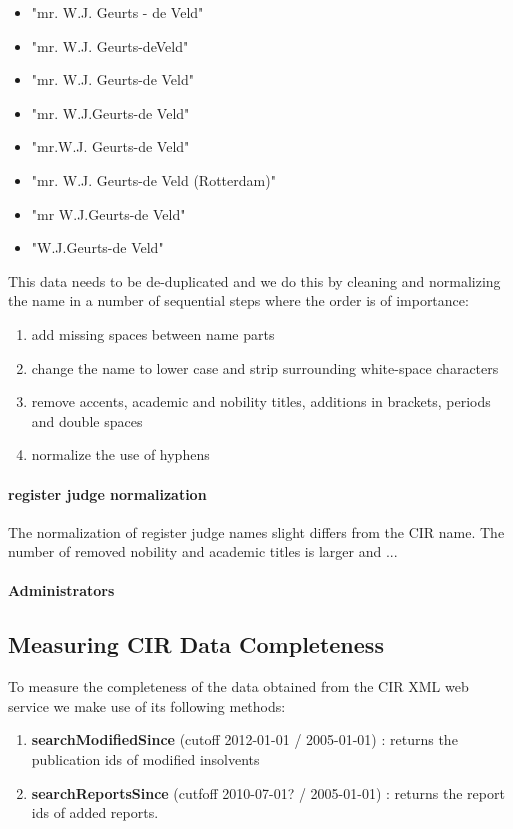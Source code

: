 \begin{itemize}
\item "mr. W.J. Geurts - de Veld"
\item "mr. W.J. Geurts-deVeld"
\item "mr. W.J. Geurts-de Veld"
\item "mr. W.J.Geurts-de Veld"
\item "mr.W.J. Geurts-de Veld"
\item "mr. W.J. Geurts-de Veld (Rotterdam)"
\item "mr W.J.Geurts-de Veld"
\item "W.J.Geurts-de Veld"
\end{itemize}

This data needs to be de-duplicated and we do this by cleaning and normalizing the name in a number of sequential steps where the order is of importance:
\begin{enumerate}
\item add missing spaces between name parts
\item change the name to lower case and strip surrounding white-space characters
\item remove accents, academic and nobility titles, additions in brackets, periods and double spaces
\item normalize the use of hyphens
\end{enumerate}

\paragraph{register judge normalization}
The normalization of register judge names slight differs from the CIR name. The number of removed nobility and academic titles is larger and ...



\paragraph{Administrators}

\subsection{Measuring CIR Data Completeness}
To measure the completeness of the data obtained from the CIR XML web service we make use of its following methods\cite{rechtspraak:tech-docs}:
\begin{enumerate}
\item \textbf{searchModifiedSince} (cutoff 2012-01-01 / 2005-01-01) : returns the publication ids of modified insolvents
\item \textbf{searchReportsSince} (cutfoff 2010-07-01? / 2005-01-01) : returns the report ids of added reports.
\end{enumerate}

